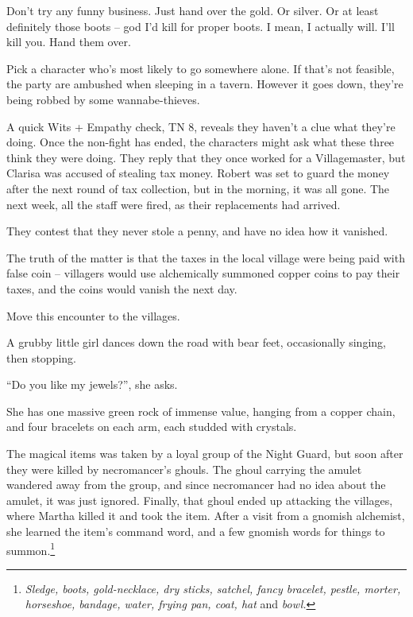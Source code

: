 \begin{multicols}{2}
\begin{speechtext}

	Don't try any funny business.  Just hand over the gold. Or silver.  Or at least definitely those boots -- god I'd kill for proper boots.  I mean, I actually will.  I'll kill you.  Hand them over.

\end{speechtext}

Pick a character who's most likely to go somewhere alone.  If that's not feasible, the party are ambushed when sleeping in a tavern.
However it goes down, they're being robbed by some wannabe-thieves.

A quick Wits + Empathy check, TN 8, reveals they haven't a clue what they're doing.  Once the non-fight has ended, the characters might ask what these three think they were doing.  They reply that they once worked for a Villagemaster, but Clarisa was accused of stealing tax money.  Robert was set to guard the money after the next round of tax collection, but in the morning, it was all gone.  The next week, all the staff were fired, as their replacements had arrived.

They contest that they never stole a penny, and have no idea how it vanished.

The truth of the matter is that the taxes in the local village were being paid with false coin -- villagers would use alchemically summoned copper coins to pay their taxes, and the coins would vanish the next day.


\humanthief


\humanthief

Move this encounter to the villages.


\begin{boxtext}
	A grubby little girl dances down the road with bear feet, occasionally singing, then stopping.

		``Do you like my jewels?'', she asks.

	She has one massive green rock of immense value, hanging from a copper chain, and four bracelets on each arm, each studded with crystals.
\end{boxtext}

The magical items was taken by a loyal group of the Night Guard, but soon after they were killed by \gls{necromancer}'s ghouls.
The ghoul carrying the amulet wandered away from the group, and since \gls{necromancer} had no idea about the amulet, it was just ignored.
Finally, that ghoul ended up attacking the villages, where Martha killed it and took the item.
After a visit from a gnomish alchemist, she learned the item's command word, and a few gnomish words for things to summon.\footnote{\textit{Sledge, boots, gold-necklace, dry sticks, satchel, fancy bracelet, pestle, morter, horseshoe, bandage, water, frying pan, coat, hat} and \textit{bowl.}}


\end{multicols}
